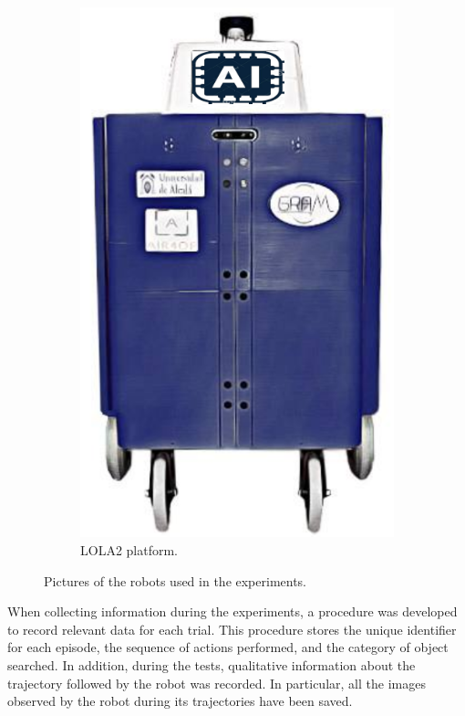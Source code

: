 \begin{figure}
\begin{subfigure}[b]{0.4\textwidth}
        \includegraphics[width=\textwidth]{figures/ros4vsn/lola2}
        \caption{LOLA2 platform.}
        \label{fig:robot_lola}
    \end{subfigure}
    \caption{Pictures of the robots used in the experiments.}\label{fig:robots}
\end{figure}

When collecting information during the experiments, a procedure was developed to record relevant data for each trial.
This procedure stores the unique identifier for each episode, the sequence of actions performed, and the category of object searched.
In addition, during the tests, qualitative information about the trajectory followed by the robot was recorded.
In particular, all the images observed by the robot during its trajectories have been saved.

